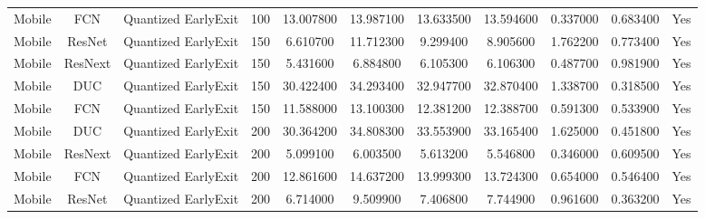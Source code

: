 \begin{tabular}{|c||c||c||c||c||c||c||c||c||c||c|}
Mobile & FCN & Quantized EarlyExit & 100 & 13.007800 & 13.987100 & 13.633500 & 13.594600 & 0.337000 & 0.683400 & Yes \\
Mobile & ResNet & Quantized EarlyExit & 150 & 6.610700 & 11.712300 & 9.299400 & 8.905600 & 1.762200 & 0.773400 & Yes \\
Mobile & ResNext & Quantized EarlyExit & 150 & 5.431600 & 6.884800 & 6.105300 & 6.106300 & 0.487700 & 0.981900 & Yes \\
Mobile & DUC & Quantized EarlyExit & 150 & 30.422400 & 34.293400 & 32.947700 & 32.870400 & 1.338700 & 0.318500 & Yes \\
Mobile & FCN & Quantized EarlyExit & 150 & 11.588000 & 13.100300 & 12.381200 & 12.388700 & 0.591300 & 0.533900 & Yes \\
Mobile & DUC & Quantized EarlyExit & 200 & 30.364200 & 34.808300 & 33.553900 & 33.165400 & 1.625000 & 0.451800 & Yes \\
Mobile & ResNext & Quantized EarlyExit & 200 & 5.099100 & 6.003500 & 5.613200 & 5.546800 & 0.346000 & 0.609500 & Yes \\
Mobile & FCN & Quantized EarlyExit & 200 & 12.861600 & 14.637200 & 13.999300 & 13.724300 & 0.654000 & 0.546400 & Yes \\
Mobile & ResNet & Quantized EarlyExit & 200 & 6.714000 & 9.509900 & 7.406800 & 7.744900 & 0.961600 & 0.363200 & Yes \\
\bottomrule
\end{tabular}
